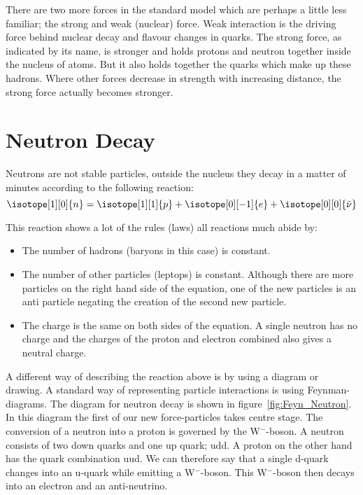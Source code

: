 There are two more forces in the standard model which are perhaps a little less familiar; the strong and weak (nuclear) force. Weak interaction is the driving force behind nuclear decay and flavour changes in quarks. The strong force, as indicated by its name, is stronger and holds protons and neutron together inside the nucleus of atoms. But it also holds together the quarks which make up these hadrons. Where other forces decrease in strength with increasing distance, the strong force actually becomes stronger.

\section{Neutron Decay}
Neutrons are not stable particles, outside the nucleus they decay in a matter of minutes according to the following reaction:
\begin{equation}
\isotope[1][0]{n} = \isotope[1][1]{p} + \isotope[0][-1]{e} + \isotope[0][0]{\bar{\nu}} \label{eq:neut_decay}
\end{equation}

This reaction shows a lot of the rules (laws) all reactions much abide by:
\begin{itemize}
\item The number of hadrons (baryons in this case) is constant.
\item The number of other particles (leptops) is constant. Although there are more particles on the right hand side of the equation, one of the new particles is an anti particle negating the creation of the second new particle.
\item The charge is the same on both sides of the equation. A single neutron has no charge and the charges of the proton and electron combined also gives a neutral charge.
\end{itemize}

A different way of describing the reaction above is by using a diagram or drawing. A standard way of representing particle interactions is using Feynman-diagrams. The diagram for neutron decay is shown in figure~\ref{fig:Feyn_Neutron}. In this diagram the first of our new force-particles takes centre stage. The conversion of a neutron into a proton is governed by the W$^-$-boson. A neutron consists of two down quarks and one up quark; udd. A proton on the other hand has the quark combination uud. We can therefore say that a single d-quark changes into an u-quark while emitting a W$^-$-boson. This W$^-$-boson then decays into an electron and an anti-neutrino.

